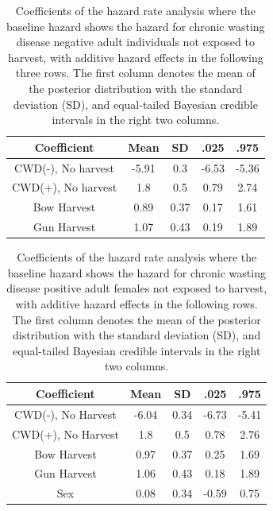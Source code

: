 \documentclass[12pt]{article}\usepackage[]{graphicx}\usepackage[]{color}
\begin{document}
\begin{table}[H]
\centering
\caption{Coefficients of the hazard rate analysis where the baseline hazard shows the hazard for chronic wasting disease negative adult individuals not exposed to harvest, with additive hazard effects in the following three rows. The first column denotes the mean of the posterior distribution with the standard deviation (SD), and equal-tailed Bayesian credible intervals in the right two columns.} 
\label{tab:hazard_v7}
\begin{tabular}{ccccc}
 Coefficient & Mean & SD & .025 & .975 \\ 
  \hline
CWD(-), No harvest & -5.91 & 0.3 & -6.53 & -5.36 \\ 
  CWD(+), No harvest & 1.8 & 0.5 & 0.79 & 2.74 \\ 
  Bow Harvest & 0.89 & 0.37 & 0.17 & 1.61 \\ 
  Gun Harvest & 1.07 & 0.43 & 0.19 & 1.89 \\ 
   \hline
\end{tabular}
\end{table}




\begin{table}[H]
\centering
\caption{Coefficients of the hazard rate analysis where the baseline hazard shows the hazard for chronic wasting disease positive adult females not exposed to harvest, with additive hazard effects in the following rows. The first column denotes the mean of the posterior distribution with the standard deviation (SD), and equal-tailed Bayesian credible intervals in the right two columns.} 
\label{tab:hazard_v8}
\begin{tabular}{ccccc}
 Coefficient & Mean & SD & .025 & .975 \\ 
  \hline
CWD(-), No Harvest & -6.04 & 0.34 & -6.73 & -5.41 \\ 
  CWD(+), No Harvest & 1.8 & 0.5 & 0.78 & 2.76 \\ 
  Bow Harvest & 0.97 & 0.37 & 0.25 & 1.69 \\ 
  Gun Harvest & 1.06 & 0.43 & 0.18 & 1.89 \\ 
  Sex & 0.08 & 0.34 & -0.59 & 0.75 \\ 
   \hline
\end{tabular}
\end{table}
\end{document}
